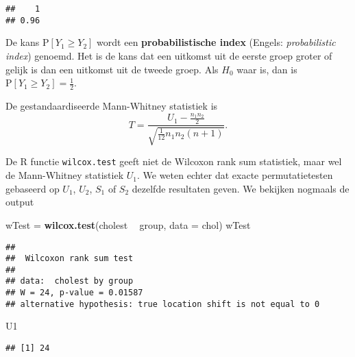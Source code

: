 \documentclass[12pt,dutch,coursenotes]{book}
\newenvironment{Shaded}{\begin{snugshade}}{\end{snugshade}}
\newcommand{\KeywordTok}[1]{\textcolor[rgb]{0.13,0.29,0.53}{\textbf{#1}}}
\newcommand{\DataTypeTok}[1]{\textcolor[rgb]{0.13,0.29,0.53}{#1}}
\newcommand{\StringTok}[1]{\textcolor[rgb]{0.31,0.60,0.02}{#1}}
\newcommand{\OperatorTok}[1]{\textcolor[rgb]{0.81,0.36,0.00}{\textbf{#1}}}
\newcommand{\NormalTok}[1]{#1}
\theoremstyle{definition}
\theoremstyle{definition}
\theoremstyle{definition}
\theoremstyle{remark}
\begin{document}
\begin{verbatim}
##    1 
## 0.96
\end{verbatim}

De kans \(\text{P}\left[Y_1 \geq Y_2\right]\) wordt een
\textbf{probabilistische index} (Engels: \emph{probabilistic index})
genoemd. Het is de kans dat een uitkomst uit de eerste groep groter of
gelijk is dan een uitkomst uit de tweede groep. Als \(H_0\) waar is, dan
is \(\text{P}\left[Y_1 \geq Y_2\right]=\frac{1}{2}\).

De gestandaardiseerde Mann-Whitney statistiek is \[
  T = \frac{U_1 - \frac{n_1n_2}{2}}{\sqrt{\frac{1}{12}n_1n_2(n+1)}}. 
\]

De R functie \texttt{wilcox.test} geeft niet de Wilcoxon rank sum
statistiek, maar wel de Mann-Whitney statistiek \(U_1\). We weten echter
dat exacte permutatietesten gebaseerd op \(U_1\), \(U_2\), \(S_1\) of
\(S_2\) dezelfde resultaten geven. We bekijken nogmaals de output

\begin{Shaded}
\begin{Highlighting}[]
\NormalTok{wTest =}\StringTok{ }\KeywordTok{wilcox.test}\NormalTok{(cholest }\OperatorTok{~}\StringTok{ }\NormalTok{group, }\DataTypeTok{data =}\NormalTok{ chol)}
\NormalTok{wTest}
\end{Highlighting}
\end{Shaded}

\begin{verbatim}
## 
##  Wilcoxon rank sum test
## 
## data:  cholest by group
## W = 24, p-value = 0.01587
## alternative hypothesis: true location shift is not equal to 0
\end{verbatim}

\begin{Shaded}
\begin{Highlighting}[]
\NormalTok{U1}
\end{Highlighting}
\end{Shaded}

\begin{verbatim}
## [1] 24
\end{verbatim}

\begin{Shaded}
\end{Shaded}
\end{document}
